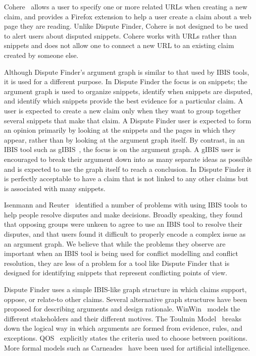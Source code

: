 \documentclass{www2010-submission}
\begin{document}
Cohere~\cite{Shum2008} allows a user to specify one or more related URLs when creating a new claim, and provides a Firefox extension to help a user create a claim about a web page they are reading. Unlike Dispute Finder, Cohere is not designed to be used to alert users about disputed snippets. Cohere works with URLs rather than snippets and does not allow one to connect a new URL to an existing claim created by someone else. 

Although Dispute Finder's argument graph is similar to that used by IBIS tools, it is used for a different purpose. 
In Dispute Finder the focus is on snippets; the argument graph is used to organize snippets, identify when snippets are disputed, and identify which snippets provide the best evidence for a particular claim. 
A user is expected to create a new claim only when they want to group together several snippets that make that claim. 
A Dispute Finder user is expected to form an opinion primarily by looking at the snippets and the pages in which they appear, rather than by looking at the argument graph itself. By contrast, in an IBIS tool such as gIBIS~\cite{Conklin1987a}, the focus is on the argument graph. A gIBIS user is encouraged to break their argument down into as many separate ideas as possible and is expected to use the graph itself to reach a conclusion. In Dispute Finder it is perfectly acceptable to have a claim that is not linked to any other claims but is associated with many snippets.

Isenmann and Reuter~\cite{Isenmann1997} identified a number of problems with using IBIS tools to help people resolve disputes and make decisions. Broadly speaking, they found that opposing groups were unkeen to agree to use an IBIS tool to resolve their disputes, and that users found it difficult to properly encode a complex issue as an argument graph. We believe that while the problems they observe are important when an IBIS tool is being used for conflict modelling and conflict resolution, they are less of a problem for a tool like Dispute Finder that is designed for identifying snippets that represent conflicting points of view.

Dispute Finder uses a simple IBIS-like graph structure in which claims support, oppose, or relate-to other claims. Several alternative graph structures have been proposed for describing arguments and design rationale. WinWin~\cite{Boehm2006} models the different stakeholders and their different motives. The Toulmin Model~\cite{toulmin1958} breaks down the logical way in which arguments are formed from evidence, rules, and exceptions. QOS~\cite{Maclean1991} explicitly states the criteria used to choose between positions. More formal models such as Carneades~\cite{Gordon2007} have been used for artificial intelligence.
\end{document}
